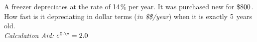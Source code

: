 



\MULTIPLY\dep\yrs\m
\gcalcexpr[2]

\question[2] A freezer depreciates at the rate of $14$\% per year. It
was purchased new for \$$800$. How fast is it depreciating in dollar
terms (\textit{in \$\$/year}) when it is exactly $5$ years old.\\
\textit{Calculation Aid: $e^{0.\m}=\calcaid$}

\watchout

